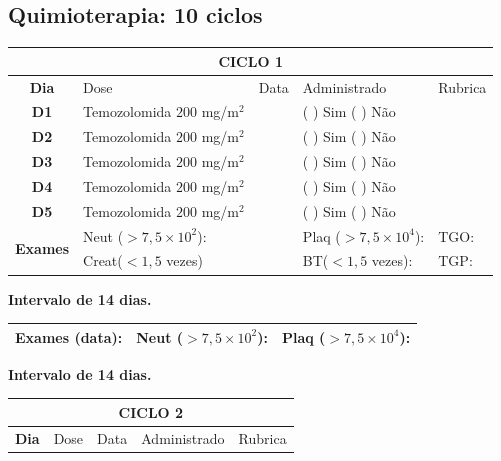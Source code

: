 \documentclass[11pt,a4paper,oldfontcommands]{memoir}
\begin{document}
\subsection{Quimioterapia: 10 ciclos}
\begin{center}
\begin{table}[H]
\begin{tabular}{p{1cm}p{5cm}|p{1cm}|p{4.5cm}|p{2cm}}
	\hline
	\multicolumn{5}{c}{\textbf{CICLO 1}}\\
\hline
    \multicolumn{1}{c|}{\multirow{1}{*}{\textbf{Dia}}}&{Dose}&{Data}&{Administrado}&{Rubrica} \\
    \hline
    \multicolumn{1}{c|}{\multirow{1}{*}{\textbf{D1}}}&{Temozolomida \(200\) mg/m\(^2\)}&&{(  ) Sim (  ) Não}&\\
    \multicolumn{1}{c|}{\multirow{1}{*}{\textbf{D2}}}&{Temozolomida \(200\) mg/m\(^2\)}&&{(  ) Sim (  ) Não}&\\
    \multicolumn{1}{c|}{\multirow{1}{*}{\textbf{D3}}}&{Temozolomida \(200\) mg/m\(^2\)}&&{(  ) Sim (  ) Não}&\\
    \multicolumn{1}{c|}{\multirow{1}{*}{\textbf{D4}}}&{Temozolomida \(200\) mg/m\(^2\)}&&{(  ) Sim (  ) Não}&\\
    \multicolumn{1}{c|}{\multirow{1}{*}{\textbf{D5}}}&{Temozolomida \(200\) mg/m\(^2\)}&&{(  ) Sim (  ) Não}&\\
    \hline
    \multicolumn{1}{c|}{\multirow{2}{*}{\textbf{Exames}}}&\multicolumn{2}{l|}{Neut (\(>7,5\times10^2\)):}&{Plaq (\(>7,5\times10^4\)):}&{TGO:}\\
    \cline{2-5}
    \multicolumn{1}{c|}{\multirow{2}{*}{{}}}&\multicolumn{2}{l|}{Creat(\(<1,5\) vezes)}&{BT(\(<1,5\) vezes):}&{TGP:}
    \\
    \hline
\end{tabular}
\end{table}
\textbf{Intervalo de 14 dias.}
\begin{table}[H]
\begin{tabular}{p{5cm}|p{5cm}|p{4.7cm}}
    \hline
    \textbf{Exames (data):}&{Neut (\(>7,5\times10^2\)):}&{Plaq (\(>7,5\times10^4\)):}\\
    \hline
\end{tabular}
\end{table}
\textbf{Intervalo de 14 dias.}
\begin{table}[H]
\begin{tabular}{p{1cm}p{5cm}|p{1cm}|p{4.5cm}|p{2cm}}
	\hline
	\multicolumn{5}{c}{\textbf{CICLO 2}}\\
\hline
    \multicolumn{1}{c|}{\multirow{1}{*}{\textbf{Dia}}}&{Dose}&{Data}&{Administrado}&{Rubrica} \\

\end{tabular}
\end{table}
\end{center}
\end{document}
